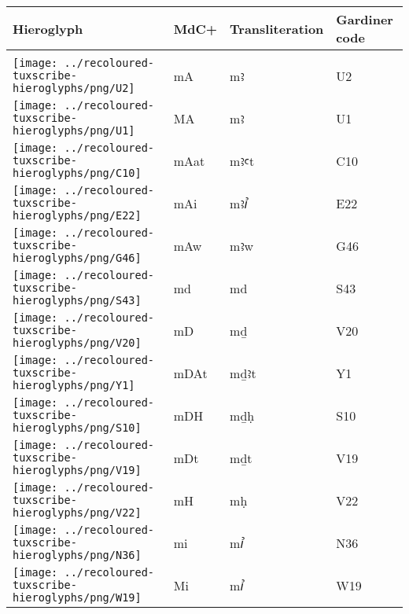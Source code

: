 \begin{center}
	\begin{tabularx}{\linewidth}{YYYY}
		Hieroglyph & MdC+ & Transliteration & Gardiner code\\
		\hline\\
		\texttt{[image: ../recoloured-tuxscribe-hieroglyphs/png/U2]} & mA & mꜣ & U2 \\ 
		\texttt{[image: ../recoloured-tuxscribe-hieroglyphs/png/U1]} & MA & mꜣ & U1 \\ 
		\texttt{[image: ../recoloured-tuxscribe-hieroglyphs/png/C10]} & mAat & mꜣꜥt & C10 \\ 
		\texttt{[image: ../recoloured-tuxscribe-hieroglyphs/png/E22]} & mAi & mꜣꞽ & E22 \\ 
		\texttt{[image: ../recoloured-tuxscribe-hieroglyphs/png/G46]} & mAw & mꜣw & G46 \\ 
		\texttt{[image: ../recoloured-tuxscribe-hieroglyphs/png/S43]} & md & md & S43 \\ 
		\texttt{[image: ../recoloured-tuxscribe-hieroglyphs/png/V20]} & mD & mḏ & V20 \\ 
		\texttt{[image: ../recoloured-tuxscribe-hieroglyphs/png/Y1]} & mDAt & mḏꜣt & Y1 \\ 
		\texttt{[image: ../recoloured-tuxscribe-hieroglyphs/png/S10]} & mDH & mḏḥ & S10 \\ 
		\texttt{[image: ../recoloured-tuxscribe-hieroglyphs/png/V19]} & mDt & mḏt & V19 \\ 
		\texttt{[image: ../recoloured-tuxscribe-hieroglyphs/png/V22]} & mH & mḥ & V22 \\ 
		\texttt{[image: ../recoloured-tuxscribe-hieroglyphs/png/N36]} & mi & mꞽ & N36 \\ 
		\texttt{[image: ../recoloured-tuxscribe-hieroglyphs/png/W19]} & Mi & mꞽ & W19 \\ 
	\end{tabularx}
\end{center}


